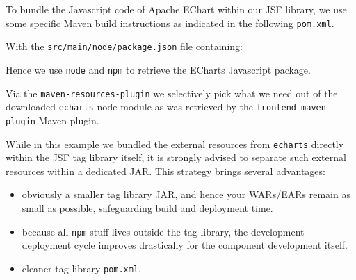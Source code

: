 To bundle the Javascript code of Apache EChart within our JSF library, we use some specific Maven build instructions as indicated in the following \texttt{pom.xml}.

With the \texttt{src/main/node/package.json} file containing:

Hence we use \texttt{node} and \texttt{npm} to retrieve the ECharts Javascript package.

Via the \texttt{maven-resources-plugin} we selectively pick what we need out of the downloaded \texttt{echarts} node module as was retrieved by the \texttt{frontend-maven-plugin} Maven plugin.

While in this example we bundled the external resources from \texttt{echarts} directly within the JSF tag library itself,
it is strongly advised to separate such external resources within a dedicated JAR.
This strategy brings several advantages:
\begin{itemize}
	\item obviously a smaller tag library JAR, and hence your WARs/EARs remain as small as possible, safeguarding build and deployment time.
	\item because all \texttt{npm} stuff lives outside the tag library, the development-deployment cycle improves drastically for the component development itself.
	\item cleaner tag library \texttt{pom.xml}.
\end{itemize}